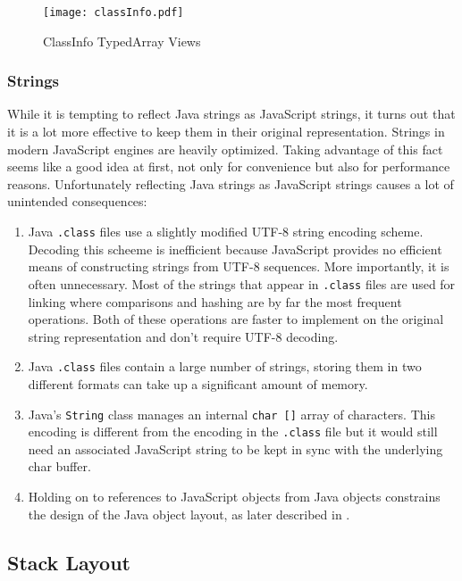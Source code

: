 \documentclass{acm_proc_article-sp}
\begin{document}
\begin{figure}[htbp]
\begin{center}
\texttt{[image: classInfo.pdf]}
\caption{ClassInfo TypedArray Views}
\label{default}
\end{center}
\end{figure}

\subsubsection{Strings}

While it is tempting to reflect Java strings as JavaScript strings, it turns out that it is a lot more effective to keep them in their original representation.
Strings in modern JavaScript engines are heavily optimized.
Taking advantage of this fact seems like a good idea at first, not only for convenience but also for performance reasons.
Unfortunately reflecting Java strings as JavaScript strings causes a lot of unintended consequences:

\begin{enumerate}
\item Java \texttt{.class} files use a slightly modified UTF-8 string encoding scheme.
Decoding this scheeme is inefficient because JavaScript provides no efficient means of constructing strings from UTF-8 sequences.
More importantly, it is often unnecessary.
Most of the strings that appear in \texttt{.class} files are used for linking where comparisons and hashing are by far the most frequent operations.
Both of these operations are faster to implement on the original string representation and don't require UTF-8 decoding.
\item Java \texttt{.class} files contain a large number of strings, storing them in two different formats can take up a significant amount of memory.
\item Java's \texttt{String} class manages an internal \texttt{char []} array of characters.
This encoding is different from the encoding in the \texttt{.class} file but it would still need an associated JavaScript string to be kept in sync with the underlying char buffer.
\item Holding on to references to JavaScript objects from Java objects constrains the design of the Java object layout, as later described in .
\end{enumerate}

\subsection{Stack Layout}
\end{document}
